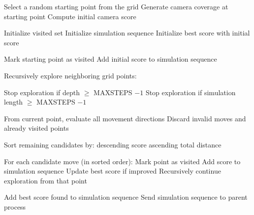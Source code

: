 \begin{algorithm}
[htb!]
\caption{Depth-First search pseudocode}
\label{pseudo:dfs}
\begin{algorithmic}
  [1] \STATE Select a random starting point from the grid \STATE Generate camera
  coverage at starting point \STATE Compute initial camera score

  \STATE Initialize visited set \STATE Initialize simulation sequence \STATE
  Initialize best score with initial score

  \STATE Mark starting point as visited \STATE Add initial score to simulation
  sequence

  \STATE Recursively explore neighboring grid points:

  \STATE \quad Stop exploration if depth $\ge$ MAXSTEPS $-1$ \STATE \quad
  Stop exploration if simulation length $\ge$ MAXSTEPS $-1$

  \STATE \quad From current point, evaluate all movement directions \STATE
  \quad Discard invalid moves and already visited points

  \STATE \quad Sort remaining candidates by: \STATE \qquad descending score
  \STATE \qquad ascending total distance

  \STATE \quad For each candidate move (in sorted order): \STATE \qquad Mark
  point as visited \STATE \qquad Add score to simulation sequence \STATE
  \qquad Update best score if improved \STATE \qquad Recursively continue
  exploration from that point

  \STATE Add best score found to simulation sequence \STATE Send simulation sequence
  to parent process
\end{algorithmic}
\end{algorithm}